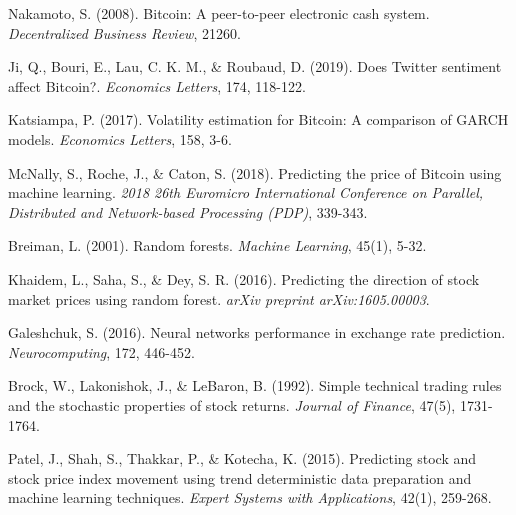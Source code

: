\documentclass[11pt,a4paper]{article}
\begin{document}
\begin{thebibliography}{99}

Nakamoto, S. (2008). Bitcoin: A peer-to-peer electronic cash system. \textit{Decentralized Business Review}, 21260.

Ji, Q., Bouri, E., Lau, C. K. M., \& Roubaud, D. (2019). Does Twitter sentiment affect Bitcoin?. \textit{Economics Letters}, 174, 118-122.

Katsiampa, P. (2017). Volatility estimation for Bitcoin: A comparison of GARCH models. \textit{Economics Letters}, 158, 3-6.

McNally, S., Roche, J., \& Caton, S. (2018). Predicting the price of Bitcoin using machine learning. \textit{2018 26th Euromicro International Conference on Parallel, Distributed and Network-based Processing (PDP)}, 339-343.

Breiman, L. (2001). Random forests. \textit{Machine Learning}, 45(1), 5-32.

Khaidem, L., Saha, S., \& Dey, S. R. (2016). Predicting the direction of stock market prices using random forest. \textit{arXiv preprint arXiv:1605.00003}.

Galeshchuk, S. (2016). Neural networks performance in exchange rate prediction. \textit{Neurocomputing}, 172, 446-452.

Brock, W., Lakonishok, J., \& LeBaron, B. (1992). Simple technical trading rules and the stochastic properties of stock returns. \textit{Journal of Finance}, 47(5), 1731-1764.

Patel, J., Shah, S., Thakkar, P., \& Kotecha, K. (2015). Predicting stock and stock price index movement using trend deterministic data preparation and machine learning techniques. \textit{Expert Systems with Applications}, 42(1), 259-268.

\end{thebibliography}
\end{document}
